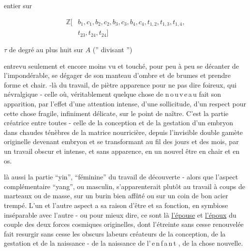entier sur

\[
 \begin{aligned}
 \mathbb Z[&b_1,c_1,b_2,c_2,b_3,c_3,b_4,c_4,t_{1,2},t_{1,3},t_{1,4},\\
 &t_{23},t_{24},t_{24}]
 \end{aligned}
\]

$\tau$ de degré au plus huit sur $A$ ('' divisant '')

entrevu seulement et encore moins vu et touché, pour peu à peu se   décanter de l'impondérable, se dégager de son manteau d'ombre et de brumes et prendre forme et chair.    -là du travail, de piètre apparence pour ne pas dire foireux, qui   névralgique - celle où, véritablement quelque chose de \mbox{n\,o\,u\,v\,e\,a\,u} fait son apparition, par l'effet d'une attention intense, d'une sollicitude, d'un respect pour cette chose fragile, infiniment délicate, sur le point de naître. C'est la partie créatrice entre toutes - celle de la conception et de la gestation d'un  embryon dans  chaudes ténèbres de la matrice nourricière,  depuis l'invisible double gamète  originelle devenant embryon et se transformant au fil des jours et des mois, par un travail obscur et intense,  et sans apparence, en un nouvel être en chair et en os.

 là aussi la partie  ``yin'', ``féminine\deleted{\unsure{,}}'' du travail de découverte - alors que  l'aspect complémentaire ``yang'', ou masculin, s'apparenterait plutôt  au travail à coups de marteaux ou de masse, sur un burin bien affûté ou sur un coin de bon acier trempé. L'un et l'autre aspect a sa raison d'être et sa fonction, en symbiose inséparable  avec l'autre - ou pour mieux dire, ce sont là \uline{l'épouse} et \uline{l'époux} du couple des deux forces cosmiques originelles, dont l'étreinte  sans cesse renouvelée fait resurgir sans cesse les obscurs labeurs créateurs de la conception, de la gestation et de la naissance - de la naissance de \mbox{l'\,e\,n\,f\,a\,n\,t} , de la chose nouvelle.

